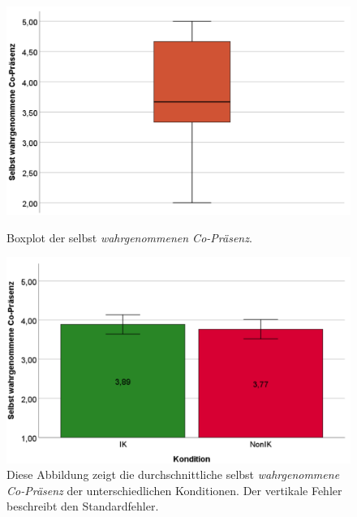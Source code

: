 \documentclass[a4paper,11pt]{article}%
\renewcommand{\\}{\vspace*{0.5\baselineskip} \newline}
\begin{document}
{	\begin{figure}[H]
   \begin{minipage}[t]{.5\linewidth} %
      \includegraphics[width=\linewidth]{Abbildungen/AuswertungDiagramme/Final/BP_SelfCoPresence.png}
      \caption[Boxplot der selbst wahrgenommenen Co-Präsenz]{Boxplot der selbst \textit{wahrgenommenen Co-Präsenz}.}
            \label{SD_SelfCoPresenceBP}
   \end{minipage}
   \hspace{.02\linewidth}%
   \begin{minipage}[t]{.5\linewidth} %
     \includegraphics[width=\linewidth]{Abbildungen/AuswertungDiagramme/Final/SD_SelbstCoPresence_Mittelwerte.png}
      \caption[Durchschnittlich selbst wahrgenommene Co-Präsenz der Konditionen]{Diese Abbildung zeigt die durchschnittliche selbst \textit{wahrgenommene Co-Präsenz} der unterschiedlichen Konditionen. Der vertikale Fehler beschreibt den Standardfehler.}
       \label{SD_SelbstCoPresence_Mittelwerte}
   \end{minipage}
\end{figure}

}
\end{document}
